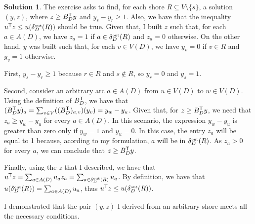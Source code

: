 \documentclass[11pt,leqno,final]{amsart}
\theoremstyle{definition}
\newtheorem{solution}{Solution}
\begin{document}

\begin{solution}
    The exercise asks to find, for each shore $R \subseteq V \setminus \{s\}$, a solution $(y,z)$, where $z \geq B_{D}^{\transp}y$ and $y_{s} - y_{r} \geq 1$. Also, we have that the inequality $u^{\transp}z \leq u(\deltaout[D](R))$ should be true. 
    Given that, I built $z$ such that, for each $a \in A(D)$, we have $z_a = 1$ if $a \in \deltaout[D](R)$ and $z_a = 0$ otherwise. On the other hand, $y$ was built such that, for each $v \in V(D)$, we have $y_v = 0$ if $v \in R$ and $y_v = 1$ otherwise.

    First, $y_{s} - y_{r} \geq 1$ because $r \in R$ and $s \notin R$, so $y_r = 0$ and $y_s = 1$. 

    Second, consider an arbitrary arc $a \in A(D)$ from $u \in V(D)$ to $w \in V(D)$. Using the definition of $B_{D}^{\transp}$, we have that $(B_{D}^{\transp}y)_a = \sum_{v \in V} ((B_{D}^{\transp})_{a,v}) (y_v) = y_w - y_u$. Given that, for $z \geq B_{D}^{\transp}y$, we need that $z_a \geq y_w - y_u$ for every $a \in A(D)$. In this scenario, the expression $y_w - y_u$ is greater than zero only if $y_w = 1$ and $y_u = 0$. In this case, the entry $z_a$ will be equal to 1 because, acording to my formulation, $a$ will be in $\deltaout[D](R)$. As $z_a > 0$ for every $a$, we can conclude that $z \geq B_{D}^{\transp}y$.

    Finally, using the $z$ that I described, we have that $u^{\transp}z = \sum_{a \in A(D)} u_a z_a = \sum_{a \in \deltaout[D](R)} u_a$. By definition, we have that $u(\deltaout[D](R)) = \sum_{a \in A(D)} u_a$, thus $u^{\transp}z \leq u(\deltaout[D](R))$. 

    I demonstrated that the pair $(y,z)$ I derived from an arbitrary shore meets all the necessary conditions.

\end{solution}
\end{document}
